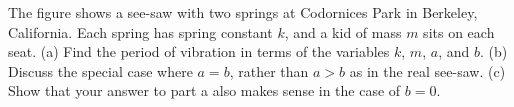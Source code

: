 The figure shows a see-saw with two springs at
Codornices Park in Berkeley, California. Each spring has
spring constant $k$, and a kid of mass $m$ sits on each
seat. (a) Find the period of vibration in terms of the
variables $k$, $m$, $a$, and $b$. (b) Discuss the special case
where $a=b$, rather than $a>b$ as in the real see-saw. (c)
Show that your answer to part a also makes sense in the case of $b=0$.
\answercheck
